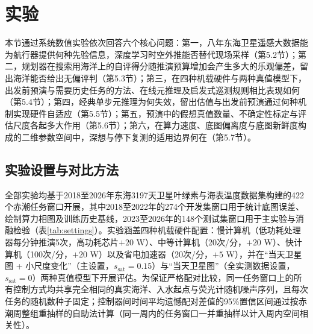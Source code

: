 \section{实验}

本节通过系统数值实验依次回答六个核心问题：第一，八年东海卫星遥感大数据能为航行器提供何种先验信息，深度学习时空外推能否替代现场采样（第5.2节）；第二，规划器在搜索用海洋上的自评得分随推演预算增加会产生多大的乐观偏差，留出海洋能否给出无偏评判（第5.3节）；第三，在四种机载硬件与两种真值模型下，出发前预演与需要历史任务的方法、在线元推理及启发式巡测规则相比表现如何（第5.4节）；第四，经典单步元推理为何失效，留出估值与出发前预演通过何种机制实现硬件自适应（第5.5节）；第五，预演中的假想真值数量、不确定性标定与评估尺度各起多大作用（第5.6节）；第六，在算力速度、底图偏离度与底图新鲜度构成的二维参数空间中，深想与停下复测的适用边界何在（第5.7节）。

\subsection{实验设置与对比方法}

全部实验均基于2018至2026年东海3197天卫星叶绿素与海表温度数据集构建的422个赤潮任务窗口开展，其中2018至2022年的274个开发集窗口用于统计底图误差、绘制算力相图及训练历史基线，2023至2026年的148个测试集窗口用于主实验与消融检验（表\ref{tab:settings}）。实验涵盖四种机载硬件配置：慢计算机（低功耗处理器每分钟推演5次，高功耗芯片$+20\text{ W}$）、中等计算机（20次/分，$+20\text{ W}$）、快计算机（100次/分，$+20\text{ W}$）以及省电加速器（20次/分，$+5\text{ W}$），并在“当天卫星图 + 小尺度变化”（主设置，$s_{\text{sat}}=0.15$）与“当天卫星图”（全实测数据设置，$s_{\text{sat}}=0$）两种真值模型下开展评估。为保证严格配对比较，同一任务窗口上的所有控制方式均共享完全相同的真实海洋、入水起点与荧光计随机噪声序列，且每次任务的随机数种子固定；控制器间时间平均遗憾配对差值的95\%置信区间通过按赤潮周整组重抽样的自助法计算（同一周内的任务窗口一并重抽样以计入周内空间相关性）。

\begin{table}[htbp]
  \centering
  \caption{东海赤潮应急巡测实验的核心参数与评价设置。}
  \label{tab:settings}
  
\end{table}

